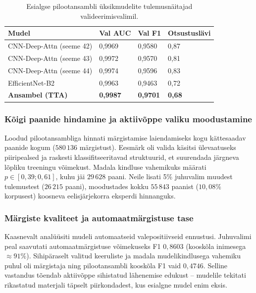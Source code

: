 \begin{table}[h!]
\centering
\caption{Esialgse pilootansambli üksikmudelite tulemusnäitajad valideerimisvalimil.}
\label{tab:initial-ensemble}
\begin{tabular}{llll}
\hline
\textbf{Mudel} & \textbf{Val AUC} & \textbf{Val F1} & \textbf{Otsustuslävi} \\
\hline
CNN-Deep-Attn (seeme 42) & 0,9969 & 0,9580 & 0,87 \\
CNN-Deep-Attn (seeme 43) & 0,9972 & 0,9570 & 0,81 \\
CNN-Deep-Attn (seeme 44) & 0,9974 & 0,9596 & 0,83 \\
EfficientNet-B2           & 0,9963 & 0,9463 & 0,72 \\
\hline
\textbf{Ansambel (TTA)}   & \textbf{0,9987} & \textbf{0,9701} & \textbf{0,68} \\
\hline
\end{tabular}
\end{table}

\subsubsection{Kõigi paanide hindamine ja aktiivõppe valiku moodustamine}
\label{koigi-paanide-hindamine}

Loodud pilootansambliga hinnati märgistamise laiendamiseks kogu kättesaadav paanide kogum ($580\,136$ märgistust). Eesmärk oli valida käsitsi ülevaatuseks piiripealsed ja raskesti klassifitseeritavad struktuurid, et suurendada järgneva lõpliku treeningu võimekust.
Madala kindluse vahemikuks määrati $p \in [0{,}39; 0{,}61]$, kuhu jäi $29\,628$ paani. Neile lisati 5\% juhuvalim muudest tulemustest ($26\,215$ paani), moodustades kokku $55\,843$ paanist ($10{,}08\%$ korpusest) koosneva eelisjärjekorra eksperdi hinnanguks.

\subsubsection{Märgiste kvaliteet ja automaatmärgistuse tase}
\label{margiste-kvaliteet}

Kaasnevalt analüüsiti mudeli automaatseid valepositiivseid ennustusi. Juhuvalimi peal saavutati automaatmärgistuse võimekuseks F1 $0{,}8603$ (kooskõla inimesega $\approx 91\%$). Sihipäraselt valitud keeruliste ja madala mudelikindlusega vahemiku puhul oli märgistaja ning pilootansambli kooskõla F1 vaid $0{,}4746$. Selline vastandus tõendab aktiivõppe sihistatud lähenemise edukust -- mudelile tekitati rikastatud materjali täpselt piirkondadest, kus esialgne mudel enim eksis.

